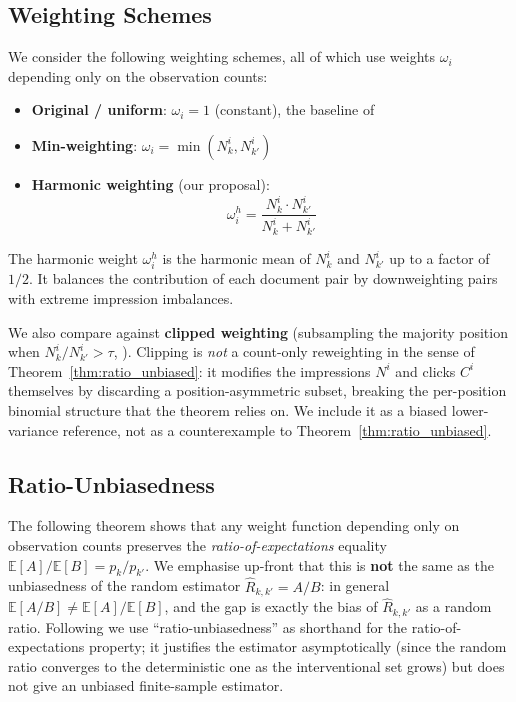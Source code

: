 \documentclass[sigconf]{acmart}
\begin{document}
\subsection{Weighting Schemes}

We consider the following weighting schemes, all of which use weights $\omega_i$ depending only on the observation counts:

\begin{itemize}
\item \textbf{Original / uniform}: $\omega_i = 1$ (constant), the baseline of \cite{agarwal2019estimating}
\item \textbf{Min-weighting}: $\omega_i = \min(N_k^i, N_{k'}^i)$
\item \textbf{Harmonic weighting} (our proposal):
\begin{equation}
\omega_i^h = \frac{N_k^i \cdot N_{k'}^i}{N_k^i + N_{k'}^i}
\end{equation}
\end{itemize}

The harmonic weight $\omega_i^h$ is the harmonic mean of $N_k^i$ and $N_{k'}^i$ up to a factor of $1/2$. It balances the contribution of each document pair by downweighting pairs with extreme impression imbalances.

We also compare against \textbf{clipped weighting} (subsampling the majority position when
$N_k^i/N_{k'}^i > \tau$, \cite{bottou2013counterfactual}). Clipping is \emph{not} a count-only
reweighting in the sense of Theorem~\ref{thm:ratio_unbiased}: it modifies the impressions
$N^i$ and clicks $C^i$ themselves by discarding a position-asymmetric subset, breaking the
per-position binomial structure that the theorem relies on. We include it as a biased
lower-variance reference, not as a counterexample to Theorem~\ref{thm:ratio_unbiased}.

\subsection{Ratio-Unbiasedness}

The following theorem shows that any weight function depending only on observation counts preserves the
\emph{ratio-of-expectations} equality $\mathbb{E}[A]/\mathbb{E}[B] = p_k/p_{k'}$.
We emphasise up-front that this is \textbf{not} the same as the unbiasedness of the random
estimator $\hat{R}_{k,k'} = A/B$: in general $\mathbb{E}[A/B] \neq \mathbb{E}[A]/\mathbb{E}[B]$,
and the gap is exactly the bias of $\hat{R}_{k,k'}$ as a random ratio.
Following \cite{agarwal2019estimating} we use ``ratio-unbiasedness'' as shorthand for the
ratio-of-expectations property; it justifies the estimator asymptotically (since the random ratio
converges to the deterministic one as the interventional set grows) but does not give an
unbiased finite-sample estimator.
\end{document}
